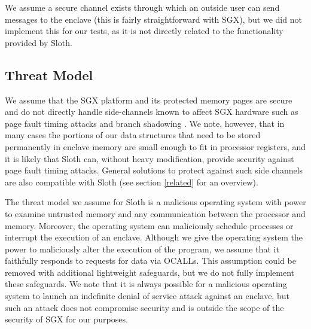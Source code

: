 \documentclass[USenglish,oneside,twocolumn]{article}
\def\name/{Sloth}
\begin{document}
We assume a secure channel exists through which an outside user can send messages to the enclave (this is fairly straightforward with SGX), but we did not implement this for our tests, as it is not directly related to the functionality provided by \name/.


\subsection{Threat Model}
We assume that the SGX platform and its protected memory pages are secure and do not directly handle side-channels known to affect SGX hardware such as page fault timing attacks \cite{XCP15} and branch shadowing \cite{LSG+16}. We note, however, that in many cases the portions of our data structures that need to be stored permanently in enclave memory are small enough to fit in processor registers, and it is likely that \name/ can, without heavy modification, provide security against page fault timing attacks. General solutions to protect against such side channels are also compatible with \name/ (see section \ref{related} for an overview). 

The threat model we assume for \name/ is a malicious operating system with power to examine untrusted memory and any communication between the processor and memory. Moreover, the operating system can maliciously schedule processes or interrupt the execution of an enclave. Although we give the operating system the power to maliciously alter the execution of the program, we assume that it faithfully responds to requests for data via OCALLs. This assumption could be removed with additional lightweight safeguards, but we do not fully implement these safeguards. We note that it is always possible for a malicious operating system to launch an indefinite denial of service attack against an enclave, but such an attack does not compromise security and is outside the scope of the security of SGX for our purposes. 
 
\end{document}
